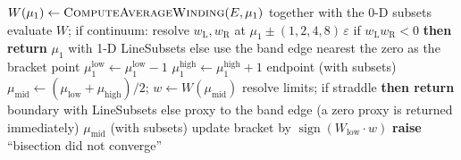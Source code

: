 \begin{algorithm}
\caption{\textsc{SolveSGBZForE}$(\mathrm{poly},E;\mu_1^{\mathrm{guess}},\mathrm{tol},n_{\max})$ —
locate the winding zero $\mu_{1,0}$: bracket expansion + plain midpoint bisection with continuum interception.}
\label{alg:solve-sgbz}
\begin{algorithmic}[1]
\State $W(\mu_1)\gets\textsc{ComputeAverageWinding}(E,\mu_1)$ together with the 0-D subsets
\State {}
  \State evaluate $W$; if continuum: resolve $w_{\mathrm{L}},w_{\mathrm{R}}$ at $\mu_1\pm(1,2,4,8)\,\varepsilon$
  \State \hspace{1.6em}if $w_{\mathrm{L}}w_{\mathrm{R}}<0$ \textbf{then return} $\mu_1$ with 1-D LineSubsets 
  \State \hspace{1.6em}else use the band edge nearest the zero as the bracket point
  \State $\mu_1^{\mathrm{low}}\gets\mu_1^{\mathrm{low}}-1$
\EndWhile
{} 
  \State $\mu_1^{\mathrm{high}}\gets\mu_1^{\mathrm{high}}+1$
\EndWhile
{} \State \Return endpoint (with subsets) \EndIf
\State {}
  \State $\mu_{\mathrm{mid}}\gets(\mu_{\mathrm{low}}+\mu_{\mathrm{high}})/2$; $w\gets W(\mu_{\mathrm{mid}})$
    \State resolve limits; if straddle \textbf{then return} boundary with LineSubsets
    \State else proxy to the band edge (a zero proxy is returned immediately)
  \EndIf
   \State \Return $\mu_{\mathrm{mid}}$ (with subsets) \EndIf
  \State update bracket by $\operatorname{sign}(W_{\mathrm{low}}\cdot w)$
\EndFor
\State \textbf{raise} ``bisection did not converge'' 
\end{algorithmic}
\end{algorithm}


